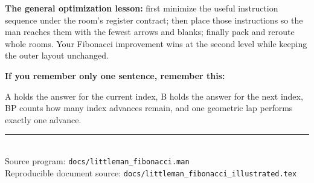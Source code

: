 \documentclass[11pt,a4paper]{article}
\begin{document}
\begin{bluebox}
  \textbf{The general optimization lesson:}
  first minimize the useful instruction sequence under the room's register
  contract; then place those instructions so the man reaches them with the
  fewest arrows and blanks; finally pack and reroute whole rooms. Your
  Fibonacci improvement wins at the second level while keeping the outer
  layout unchanged.
\end{bluebox}

\begin{keybox}
  \centering
  \Large\bfseries
  If you remember only one sentence, remember this:

  \vspace{2mm}
  \normalsize
  A holds the answer for the current index, B holds the answer for the next
  index, BP counts how many index advances remain, and one geometric lap
  performs exactly one advance.
\end{keybox}

\vfill
\begin{center}
  {\color{gold}\rule{0.7\textwidth}{1.3pt}}\\[4mm]
  \small
  Source program:
  \texttt{docs/littleman\_fibonacci.man}\\
  Reproducible document source:
  \texttt{docs/littleman\_fibonacci\_illustrated.tex}
\end{center}
\end{document}

